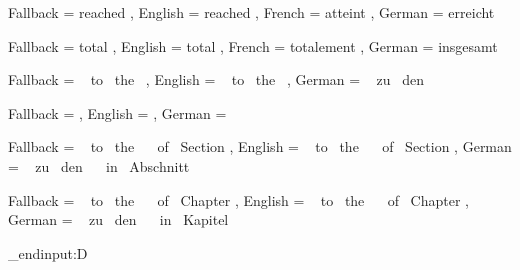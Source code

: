  {
  Fallback = reached ,
  English  = reached ,
  French   = atteint ,
  German   = erreicht
}

 {
  Fallback = total ,
  English  = total ,
  French   = totalement ,
  German   = insgesamt
}

 {
  Fallback = ~
             to~ the~  ,
  English  = ~
             to~ the~  ,
  German   = ~
             zu~ den~ 
}

 {
  Fallback =  ,
  English  =  ,
  German   = 
}

 {
  Fallback = ~
             to~ the~ ~
             of~ Section \nobreakspace \ExerciseSection ,
  English  = ~
             to~ the~ ~
             of~ Section \nobreakspace \ExerciseSection ,
  German   = ~
             zu~ den~ ~
             in~ Abschnitt \nobreakspace \ExerciseSection
}

 {
  Fallback = ~
             to~ the~ ~
             of~ Chapter \nobreakspace \ExerciseChapter ,
  English  = ~
             to~ the~ ~
             of~ Chapter \nobreakspace \ExerciseChapter ,
  German   = ~
             zu~ den~ ~
             in~ Kapitel \nobreakspace \ExerciseChapter
}

\tex_endinput:D
